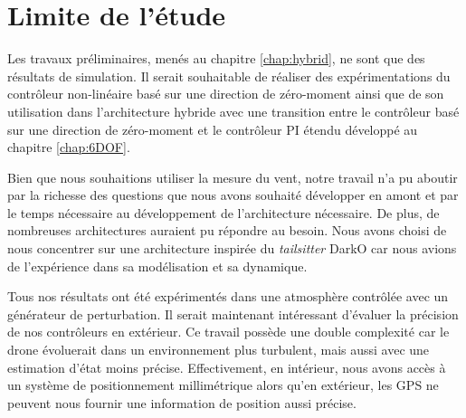 \section*{Limite de l'étude}
Les travaux préliminaires, menés au chapitre \ref{chap:hybrid}, ne sont que des résultats de simulation. Il serait souhaitable de réaliser des expérimentations du contrôleur non-linéaire basé sur une direction de zéro-moment ainsi que de son utilisation dans l'architecture hybride avec une transition entre le contrôleur basé sur une direction de zéro-moment et le contrôleur PI étendu développé au chapitre \ref{chap:6DOF}.

Bien que nous souhaitions utiliser la mesure du vent, notre travail n'a pu aboutir par la richesse des questions que nous avons souhaité développer en amont et par le temps nécessaire au développement de l'architecture nécessaire.
De plus, de nombreuses architectures auraient pu répondre au besoin. Nous avons choisi de nous concentrer sur une architecture inspirée du \textit{tailsitter} DarkO car nous avions de l'expérience dans sa modélisation et sa dynamique.

Tous nos résultats ont été expérimentés dans une atmosphère contrôlée avec un générateur de perturbation. Il serait maintenant intéressant d'évaluer la précision de nos contrôleurs en extérieur. Ce travail possède une double complexité car le drone évoluerait dans un environnement plus turbulent, mais aussi avec une estimation d'état moins précise. Effectivement, en intérieur, nous avons accès à un système de positionnement millimétrique alors qu'en extérieur, les GPS ne peuvent nous fournir une information de position aussi précise.


